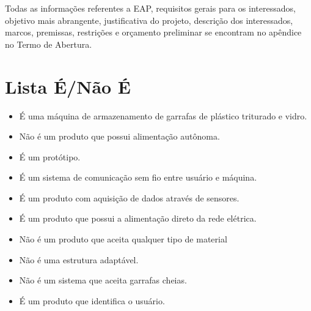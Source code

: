 Todas as informações referentes a EAP, requisitos gerais para os interessados, objetivo mais abrangente, justificativa do projeto, descrição dos interessados, marcos, premissas, restrições e orçamento preliminar se encontram no apêndice no Termo de Abertura.

\section{Lista É/Não É}

\begin{itemize}
\item É uma máquina de armazenamento de garrafas de plástico triturado e vidro.
\item Não é um produto que possui alimentação autônoma.
\item É um protótipo.
\item É um sistema de comunicação sem fio entre usuário e máquina.
\item É um produto com aquisição de dados através de sensores.
\item É um produto que possui a alimentação direto da rede elétrica.
\item Não é um produto que aceita qualquer tipo de material
\item Não é uma estrutura adaptável.
\item Não é um sistema que aceita garrafas cheias.
\item É um produto que identifica o usuário.
\end{itemize}


